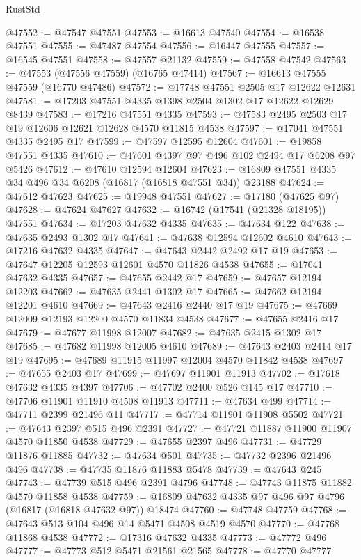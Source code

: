 \begin{lexlean}{RustStd}
\begin{coremodule}
@47552 := @47547 @47551
@47553 := @16613 @47540
@47554 := @16538 @47551
@47555 := @47487 @47554
@47556 := @16447 @47555
@47557 := @16545 @47551
@47558 := @47557 @21132
@47559 := @47558 @47542
@47563 := @47553 (@47556 @47559) (@16765 @47414)
@47567 := @16613 @47555 @47559 (@16770 @47486)
@47572 := @17748 @47551 @2505 @17 @12622 @12631
@47581 := @17203 @47551 @4335 @1398 @2504 @1302 @17 @12622 @12629 @8439
@47583 := @17216 @47551 @4335
@47593 := @47583 @2495 @2503 @17 @19 @12606 @12621 @12628 @4570 @11815 @4538
@47597 := @17041 @47551 @4335 @2495 @17
@47599 := @47597 @12595 @12604
@47601 := @19858 @47551 @4335
@47610 := @47601 @4397 @97 @496 @102 @2494 @17 @6208 @97 @5426
@47612 := @47610 @12594 @12604
@47623 := @16809 @47551 @4335 @34 @496 @34 @6208 (@16817 (@16818 @47551 @34)) @23188
@47624 := @47612 @47623
@47625 := @19948 @47551
@47627 := @17180 (@47625 @97)
@47628 := @47624 @47627
@47632 := @16742 (@17541 (@21328 @18195)) @47551
@47634 := @17203 @47632 @4335
@47635 := @47634 @122
@47638 := @47635 @2493 @1302 @17
@47641 := @47638 @12594 @12602 @4610
@47643 := @17216 @47632 @4335
@47647 := @47643 @2442 @2492 @17 @19
@47653 := @47647 @12205 @12593 @12601 @4570 @11826 @4538
@47655 := @17041 @47632 @4335
@47657 := @47655 @2442 @17
@47659 := @47657 @12194 @12203
@47662 := @47635 @2441 @1302 @17
@47665 := @47662 @12194 @12201 @4610
@47669 := @47643 @2416 @2440 @17 @19
@47675 := @47669 @12009 @12193 @12200 @4570 @11834 @4538
@47677 := @47655 @2416 @17
@47679 := @47677 @11998 @12007
@47682 := @47635 @2415 @1302 @17
@47685 := @47682 @11998 @12005 @4610
@47689 := @47643 @2403 @2414 @17 @19
@47695 := @47689 @11915 @11997 @12004 @4570 @11842 @4538
@47697 := @47655 @2403 @17
@47699 := @47697 @11901 @11913
@47702 := @17618 @47632 @4335 @4397
@47706 := @47702 @2400 @526 @145 @17
@47710 := @47706 @11901 @11910 @4508 @11913
@47711 := @47634 @499
@47714 := @47711 @2399 @21496 @11
@47717 := @47714 @11901 @11908 @5502
@47721 := @47643 @2397 @515 @496 @2391
@47727 := @47721 @11887 @11900 @11907 @4570 @11850 @4538
@47729 := @47655 @2397 @496
@47731 := @47729 @11876 @11885
@47732 := @47634 @501
@47735 := @47732 @2396 @21496 @496
@47738 := @47735 @11876 @11883 @5478
@47739 := @47643 @245
@47743 := @47739 @515 @496 @2391 @4796
@47748 := @47743 @11875 @11882 @4570 @11858 @4538
@47759 := @16809 @47632 @4335 @97 @496 @97 @4796 (@16817 (@16818 @47632 @97)) @18474
@47760 := @47748 @47759
@47768 := @47643 @513 @104 @496 @14 @5471 @4508 @4519 @4570
@47770 := @47768 @11868 @4538
@47772 := @17316 @47632 @4335
@47773 := @47772 @496
@47777 := @47773 @512 @5471 @21561 @21565
@47778 := @47770 @47777

\end{coremodule}
\end{lexlean}
